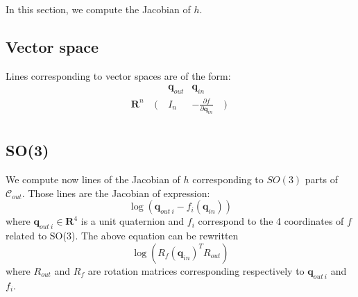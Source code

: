 \documentclass {article}
\newcommand\reals{\mathbf{R}}
\newcommand\CS{\mathcal{C}}
\newcommand\conf{\mathbf{q}}
\begin{document}
In this section, we compute the Jacobian of $h$.

\subsection {Vector space}

Lines corresponding to vector spaces are of the form:
$$
\begin{array}{ccccc}
&&\conf_{out}& \conf_{in} \\
\reals^n & \left(\right. & I_{n} & -\frac{\partial f}{\partial\conf_{in}} & \left.\right)\\
\end{array}
$$

\subsection {SO(3)}
\label{sec:J-SO3-implicit}

We compute now lines of the Jacobian of $h$ corresponding to $SO(3)$ parts of $\CS_{out}$. Those lines are the Jacobian of expression:
\begin{equation}\label{eq:SO3-implicit}
\log (\conf_{out\ i} - f_{i}(\conf_{in}))
\end{equation}
where $\conf_{out\ i}\in\reals^4$ is a unit quaternion and $f_{i}$ correspond to
the 4 coordinates of $f$ related to SO(3). The above equation can be rewritten
\begin{equation}\label{eq:SO3-implicit-R}
\log (R_{f}(\conf_{in})^T R_{out})
\end{equation}
where $R_{out}$ and $R_{f}$ are rotation matrices corresponding respectively to
$\conf_{out\ i}$ and $f_{i}$.
\end{document}
